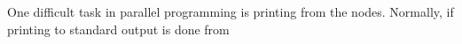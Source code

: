 
One difficult task in parallel programming is printing from the
nodes. Normally, if printing to standard output is done from 


